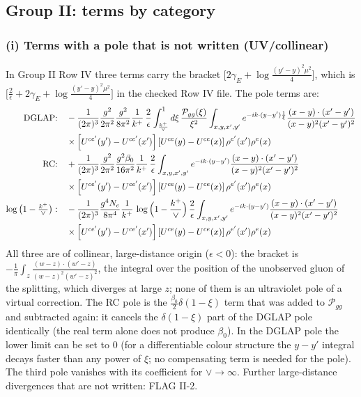 \documentclass[9pt]{article}
\numberwithin{equation}{section}
\begin{document}
\subsection{Group II: terms by category}
\subsubsection{(i) Terms with a pole that is not written (UV/collinear)}
\noindent In Group II Row IV three terms carry the bracket $\big[2\gamma_{E}+\log\frac{(y'-y)^{2}\mu^{2}}{4}\big]$, which is $\big[\frac{2}{\epsilon}+2\gamma_{E}+\log\frac{(y'-y)^{2}\mu^{2}}{4}\big]$ in the checked Row IV file. The pole terms are:
\begin{align}
\text{DGLAP:}\quad & -\frac{1}{(2\pi)^{3}}\frac{g^{2}}{2\pi^{2}}\frac{g^{2}}{8\pi^{2}}\frac{1}{k^{+}}\,\frac{2}{\epsilon}\int_{\frac{k^{+}}{\vee}}^{1}d\xi\,\frac{\mathcal P_{gg}(\xi)}{\xi^{2}}\int_{x,y,x',y'}e^{-ik\cdot(y-y')\frac{1}{\xi}}\frac{(x-y)\cdot(x'-y')}{(x-y)^{2}(x'-y')^{2}}\notag \\ & \times\left[U^{ce'}(y') - U^{ce'}(x')\right]\left[U^{ce}(y) - U^{ce}(x)\right]\rho^{e'}(x')\rho^{e}(x)\notag \\
\text{RC:}\quad & +\frac{1}{(2\pi)^{3}}\frac{g^{2}}{2\pi^{2}}\frac{g^{2}\beta_{0}}{16\pi^{2}}\frac{1}{k^{+}}\,\frac{2}{\epsilon}\int_{x,y,x',y'}e^{-ik\cdot(y-y')}\frac{(x-y)\cdot(x'-y')}{(x-y)^{2}(x'-y')^{2}}\notag \\ & \times\left[U^{ce'}(y') - U^{ce'}(x')\right]\left[U^{ce}(y) - U^{ce}(x)\right]\rho^{e'}(x')\rho^{e}(x)\notag \\
\log\big(1-\tfrac{k^{+}}{\vee}\big):\quad & -\frac{1}{(2\pi)^{3}}\frac{g^{4}N_{c}}{8\pi^{4}}\frac{1}{k^{+}}\,\log\Big(1-\frac{k^{+}}{\vee}\Big)\,\frac{2}{\epsilon}\int_{x,y,x',y'}e^{-ik\cdot(y-y')}\frac{(x-y)\cdot(x'-y')}{(x-y)^{2}(x'-y')^{2}}\notag \\ & \times\left[U^{ce'}(y') - U^{ce'}(x')\right]\left[U^{ce}(y) - U^{ce}(x)\right]\rho^{e'}(x')\rho^{e}(x)
\end{align}
All three are of collinear, large-distance origin ($\epsilon<0$): the bracket is $-\frac{1}{\pi}\int_{z}\frac{(w-z)\cdot(w'-z)}{(w-z)^{2}(w'-z)^{2}}$, the integral over the position of the unobserved gluon of the splitting, which diverges at large $z$; none of them is an ultraviolet pole of a virtual correction. The RC pole is the $\frac{\beta_{0}}{2}\delta(1-\xi)$ term that was added to $\mathcal P_{gg}$ and subtracted again: it cancels the $\delta(1-\xi)$ part of the DGLAP pole identically (the real term alone does not produce $\beta_{0}$). In the DGLAP pole the lower limit can be set to $0$ (for a differentiable colour structure the $y-y'$ integral decays faster than any power of $\xi$; no compensating term is needed for the pole). The third pole vanishes with its coefficient for $\vee\to\infty$. Further large-distance divergences that are not written: FLAG II-2.
\end{document}
